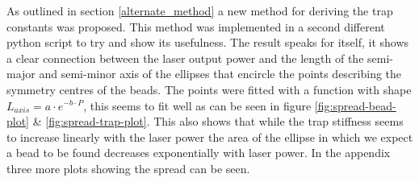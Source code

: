 As outlined in section \ref{alternate_method} a new method for deriving the trap constants was proposed. This method was implemented in a second different python script to try and show its usefulness. The result speaks for itself, it shows a clear connection between the laser output power and the length of the semi-major and semi-minor axis of the ellipses that encircle the points describing the symmetry centres of the beads. The points were fitted with a function with shape $L_{axis}=a\cdot e^{-b\cdot P}$, this seems to fit well as can be seen in figure \ref{fig:spread-bead-plot} \& \ref{fig:spread-trap-plot}. This also shows that while the trap stiffness seems to increase linearly with the laser power the area of the ellipse in which we expect a bead to be found decreases exponentially with laser power. In the appendix three more plots showing the spread can be seen.

